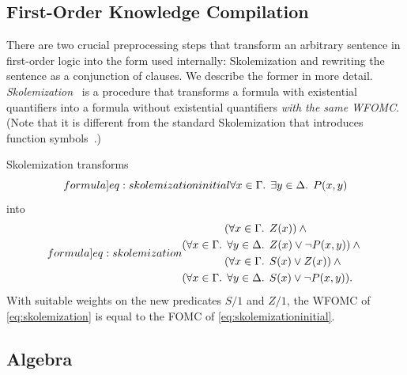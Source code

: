 \documentclass[a4paper,UKenglish,cleveref, autoref, thm-restate]{lipics-v2021}
\begin{document}
\subsection{First-Order Knowledge Compilation}\label{sec:crane}


There are two crucial preprocessing steps that transform an arbitrary sentence
in first-order logic into the form used internally: Skolemization and rewriting
the sentence as a conjunction of clauses. We describe the former in more detail.
\emph{Skolemization}~\cite{DBLP:conf/kr/BroeckMD14} is a procedure that
transforms a formula with existential quantifiers into a formula without
existential quantifiers \emph{with the same WFOMC}. (Note that it is different
from the standard Skolemization that introduces function
symbols~\cite{DBLP:books/daglib/0030198}.)

\begin{example}
  Skolemization transforms
  \begin{equation}\label[formula]{eq:skolemizationinitial}
    \forall x \in \Gamma\text{. }\exists y \in \Delta\text{. } P(x, y)
  \end{equation}
  into
  \begin{equation}\label[formula]{eq:skolemization}
    \begin{aligned}
      (\forall x \in \Gamma\text{. } &Z(x))\land{}\\
      (\forall x \in \Gamma\text{. } \forall y \in \Delta\text{. } &Z(x) \lor \neg P(x, y))\land{}\\
      (\forall x \in \Gamma\text{. } &S(x) \lor Z(x))\land{}\\
      (\forall x \in \Gamma\text{. } \forall y \in \Delta\text{. } &S(x) \lor \neg P(x, y)).
    \end{aligned}
  \end{equation}
  With suitable weights on the new predicates $S/1$ and $Z/1$, the WFOMC of
  \cref{eq:skolemization} is equal to the FOMC of
  \cref{eq:skolemizationinitial}.
\end{example}

\subsection{Algebra}\label{sec:algebra}
\end{document}
